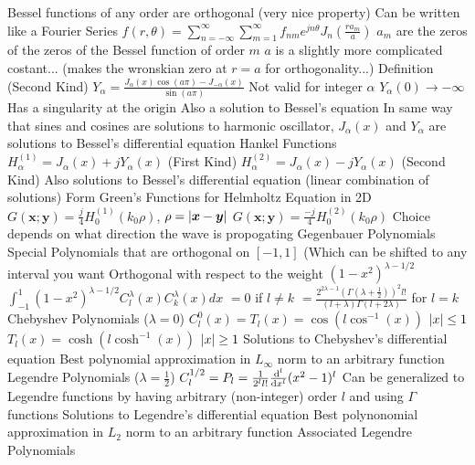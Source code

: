 \documentclass[14pt]{extarticle}
\begin{document}
\begin{outline}
					\3	Bessel functions of any order are orthogonal (very nice property)
						\4	Can be written like a Fourier Series
						\4	$f(r,\theta) = \sum_{n=-\infty}^{\infty} \sum_{m=1}^{\infty}
									f_{nm}e^{jn\theta} J_n(\frac{ra_m}{a})$
						\4	$a_m$ are the zeros of the zeros of the Bessel function of order $m$
						\4	$a$ is a slightly more complicated costant... (makes the wronskian
								zero at $r = a$ for orthogonality...)
				\2	Definition (Second Kind)
					\3	$Y_{\alpha} = \frac{J_{\alpha}(x)\cos(a\pi) - J_{-\alpha}(x)}{\sin(a\pi)}$
						\4	Not valid for integer $\alpha$
					\3	$Y_{\alpha}(0) \rightarrow -\infty$
						\4	Has a singularity at the origin
					\3	Also a solution to Bessel's equation
						\4	In same way that sines and cosines are solutions to harmonic
								oscillator, $J_{\alpha}(x)$ and $Y_{\alpha}$ are solutions
								to Bessel's differential equation
				\2	Hankel Functions
					\3	$H_{\alpha}^{(1)} = J_{\alpha}(x) + j Y_{\alpha}(x)$ (First Kind)
					\3	$H_{\alpha}^{(2)} = J_{\alpha}(x) - j Y_{\alpha}(x)$ (Second Kind)
					\3	Also solutions to Bessel's differential equation (linear combination of solutions)
					\3	Form Green's Functions for Helmholtz Equation in 2D
						\4	$G(\bm{x};\bm{y}) = \frac{j}{4}H_0^{(1)}(k_0\rho)$, $\rho = \abs{\bm{x} - \bm{y}}$
						\4	$G(\bm{x};\bm{y}) = \frac{-j}{4}H_0^{(2)}(k_0\rho)$
						\4	Choice depends on what direction the wave is propogating
			\1	Gegenbauer Polynomials
				\2	Special Polynomials that are orthogonal on $[-1,1]$ (Which can be
						shifted to any interval you want
				\2	Orthogonal with respect to the weight $(1 - x^2)^{\lambda - 1/2}$
				\2	$\int_{-1}^1 (1-x^2)^{\lambda - 1/2}C_l^{\lambda}(x)
						C^{\lambda}_k(x) dx$
					\3	$= 0$ if $l \ne k$
					\3	$= \frac{2^{2\lambda -1}(\Gamma(\lambda + \frac{1}{2}))^2l!}{(l+\lambda)\Gamma(l + 2\lambda)}$
							for $l = k$
				\2	Chebyshev Polynomials ($\lambda = 0$)
					\3	$C_l^0(x) = T_l(x) = \cos(l \cos^{-1}(x))$ $\abs{x} \le 1$
					\3	$T_l(x) = \cosh(l \cosh^{-1}(x))$ $\abs{x} \ge 1$
					\3	Solutions to Chebyshev's differential equation
					\3	Best polynomial approximation in $L_{\infty}$ norm to an arbitrary function
				\2	Legendre Polynomials ($\lambda = \frac{1}{2}$)
					\3	$C_l^{1/2} = P_l = \frac{1}{2^ll!}\od[l]{}{x}(x^2 - 1)^l$
						\4	Can be generalized to Legendre functions by having arbitrary
								(non-integer) order $l$ and using $\Gamma$ functions
					\3	Solutions to Legendre's differential equation
					\3	Best polynonomial approximation in $L_2$ norm to an arbitrary function
					\3	Associated Legendre Polynomials

\end{outline}
\end{document}
